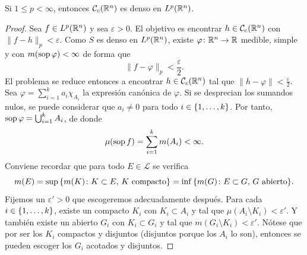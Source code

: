 \documentclass[a4paper, 11pt, oneside]{report}
\begin{document}
\begin{theorem}
  Si $1 \leq p < \infty$, entonces $\mathcal{C}_c(\mathbb R^n)$ es denso en $L^p(\mathbb R^n)$.
\end{theorem}

\begin{proof}
  Sea $f \in L^p(\mathbb R^n)$ y sea $\varepsilon>0$. El objetivo es encontrar $h \in \mathcal{C}_c(\mathbb R^n)$ con $\|f-h\|_p < \varepsilon$. Como $S$ es denso en $L^p(\mathbb R^n)$, existe $\varphi \colon \mathbb R^n \to \mathbb R$ medible, simple y con $m(\textup{sop}\, \varphi) < \infty$ de forma que
  \[\|f-\varphi\|_p<\frac{\varepsilon}{2}.\]
  El problema se reduce entonces a encontrar $h \in \mathcal{C}_c(\mathbb R^n)$ tal que $\|h-\varphi\|<\frac{\varepsilon}{2}$. Sea $\varphi= \sum_{i=1}^ka_i\chi_{A_i}$ la expresión canónica de $\varphi$. Si se desprecian los sumandos nulos, se puede considerar que $a_i \neq 0$ para todo $i \in \{1,\mathellipsis,k\}$. Por tanto, $\textup{sop}\, \varphi = \bigcup_{i=1}^k A_i$, de donde
  \[\mu(\textup{sop}\, f) = \sum_{i=1}^k m(A_i) < \infty.\]
  Conviene recordar que para todo $E \in \mathcal{L}$ se verifica
  \[m(E)=\sup\,\{m(K) \colon K \subset E, \, K \textup{ compacto}\} = \inf\,\{m(G) \colon E \subset G, \, G \textup{ abierto}\}.\]
  Fijemos un $\varepsilon'>0$ que escogeremos adecuadamente después. Para cada $i \in \{1,\mathellipsis,k\}$, existe un compacto $K_i$ con $K_i \subset A_i$ y tal que $\mu(A_i \setminus K_i) < \varepsilon' $. Y también existe un abierto $G_i$ con $K_i \subset G_i$ y tal que $m(G_i \setminus K_i) < \varepsilon'$. Nótese que por ser los $K_i$ compactos y disjuntos (disjuntos porque los $A_i$ lo son), entonces se pueden escoger los $G_i$ acotados y disjuntos.


\end{proof}
\end{document}
